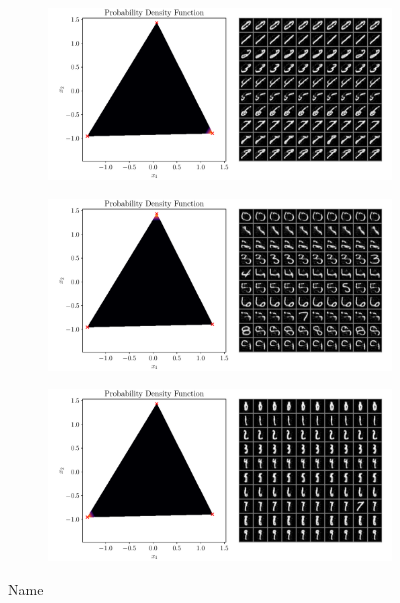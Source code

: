 \begin{figure}[htpb]
    \centering
    \begin{subfigure}[htpb]{\textwidth}
        \centering
        \includegraphics[width=1\linewidth]{figures/samples/aa_emnist1.pdf}
    \end{subfigure}

    \begin{subfigure}[htpb]{\textwidth}
        \centering
        \includegraphics[width=1\linewidth]{figures/samples/aa_emnist2.pdf}
    \end{subfigure}

    \begin{subfigure}[htpb]{\textwidth}
        \centering
        \includegraphics[width=1\linewidth]{figures/samples/aa_emnist3.pdf}
    \end{subfigure}
    \caption{Name}%
    \label{fig:name}
\end{figure}

